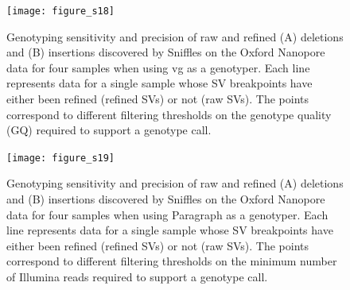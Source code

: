 \documentclass[12pt]{article}
\newenvironment{lsfigure}
	{\begin{landscape} \begin{figure} \centering}
	{\end{figure} \end{landscape}}
\begin{document}
\begin{lsfigure}
	\texttt{[image: figure\_s18]}

	\caption[Genotyping sensitivity of raw and refined Oxford Nanopore SVs for four samples using vg]{
		Genotyping sensitivity and precision of raw and refined (A) deletions and (B) insertions discovered by Sniffles on the Oxford Nanopore data for four samples when using vg as a genotyper.
		Each line represents data for a single sample whose SV breakpoints have either been refined (refined SVs) or not (raw SVs).
		The points correspond to different filtering thresholds on the genotype quality (GQ) required to support a genotype call.
	}

	\label{fig_s18}

\end{lsfigure}

\clearpage%

\begin{lsfigure}
	\texttt{[image: figure\_s19]}

	\caption[Genotyping sensitivity of raw and refined Oxford Nanopore SVs for four samples using Paragraph]{
		Genotyping sensitivity and precision of raw and refined (A) deletions and (B) insertions discovered by Sniffles on the Oxford Nanopore data for four samples when using Paragraph as a genotyper.
		Each line represents data for a single sample whose SV breakpoints have either been refined (refined SVs) or not (raw SVs).
		The points correspond to different filtering thresholds on the minimum number of Illumina reads required to support a genotype call.
	}

	\label{fig_s19}

\end{lsfigure}

\clearpage%
\end{document}
